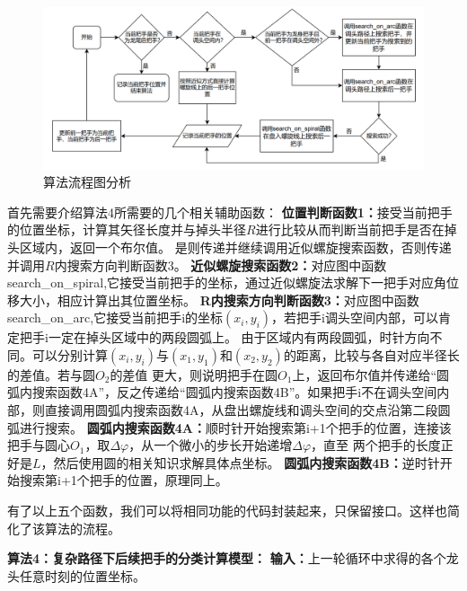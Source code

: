 \documentclass{cumcmthesis1}
\begin{document}
\begin{figure}[ht]
    \caption{算法流程图分析}
    \centering    
    \includegraphics[width=0.97\linewidth]{drawing_5.4.4.1.png}
\end{figure}
\par
首先需要介绍算法4所需要的几个相关辅助函数：
\newline
\noindent
\textbf{位置判断函数1：}接受当前把手的位置坐标，计算其矢径长度并与掉头半径$R$进行比较从而判断当前把手是否在掉头区域内，返回一个布尔值。
是则传递并继续调用近似螺旋搜索函数，否则传递并调用$R$内搜索方向判断函数3。
\newline
\noindent
\textbf{近似螺旋搜索函数2：}对应图中函数search\_on\_spiral,它接受当前把手的坐标，通过近似螺旋法求解下一把手对应角位移大小，相应计算出其位置坐标。
\newline
\noindent
\textbf{R内搜索方向判断函数3：}对应图中函数search\_on\_arc,它接受当前把手i的坐标$(x_i,y_i)$，若把手i调头空间内部，可以肯定把手i一定在掉头区域中的两段圆弧上。
由于区域内有两段圆弧，时针方向不同。可以分别计算$(x_i,y_i)$与$(x_1,y_1)$和$(x_2,y_2)$的距离，比较与各自对应半径长的差值。若与圆$O_2$的差值
更大，则说明把手在圆$O_1$上，返回布尔值并传递给“圆弧内搜索函数4A”，反之传递给“圆弧内搜索函数4B”。如果把手i不在调头空间内部，则直接调用圆弧内搜索函数4A，从盘出螺旋线和调头空间的交点沿第二段圆弧进行搜索。
\newline
\noindent
\textbf{圆弧内搜索函数4A：}顺时针开始搜索第i+1个把手的位置，连接该把手与圆心$O_1$，取$\Delta \varphi $，从一个微小的步长开始递增$\Delta \varphi $，直至
两个把手的长度正好是$L$，然后使用圆的相关知识求解具体点坐标。
\newline
\noindent
\textbf{圆弧内搜索函数4B：}逆时针开始搜索第i+1个把手的位置，原理同上。
\par
有了以上五个函数，我们可以将相同功能的代码封装起来，只保留接口。这样也简化了该算法的流程。
\par
\textbf{算法4：复杂路径下后续把手的分类计算模型：}
\newline
\noindent
\textbf{输入：}上一轮循环中求得的各个龙头任意时刻的位置坐标。
\end{document}
